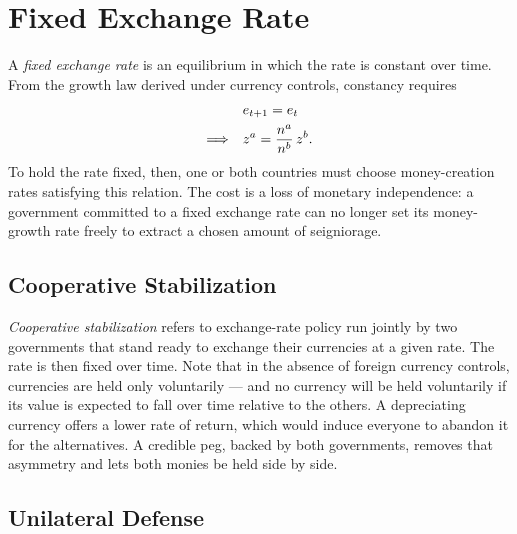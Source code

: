 
\section{Fixed Exchange Rate}

A \emph{fixed exchange rate} is an equilibrium in which the rate is constant over time. From the growth law derived under currency controls, constancy requires
\[
\begin{aligned}
& e_{t+1} = e_t\\
\Longrightarrow\quad & z^a = \frac{n^a}{n^b}\, z^b.
\end{aligned}
\]
To hold the rate fixed, then, one or both countries must choose money-creation rates satisfying this relation. The cost is a loss of monetary independence: a government committed to a fixed exchange rate can no longer set its money-growth rate freely to extract a chosen amount of seigniorage.


\subsection{Cooperative Stabilization}

\emph{Cooperative stabilization} refers to exchange-rate policy run jointly by two governments that stand ready to exchange their currencies at a given rate. The rate is then fixed over time. Note that in the absence of foreign currency controls, currencies are held only voluntarily --- and no currency will be held voluntarily if its value is expected to fall over time relative to the others. A depreciating currency offers a lower rate of return, which would induce everyone to abandon it for the alternatives. A credible peg, backed by both governments, removes that asymmetry and lets both monies be held side by side.

\subsection{Unilateral Defense}

